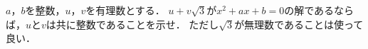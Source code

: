\documentclass[../../main.tex]{subfiles}
\begin{document}
$a$，$b$を整数，$u$，$v$を有理数とする．
$u+v\sqrt{3}$が$x^2+ax+b=0$の解であるならば，$u$と$v$は共に整数であることを示せ．
ただし$\sqrt{3}$が無理数であることは使って良い．
\end{document}
